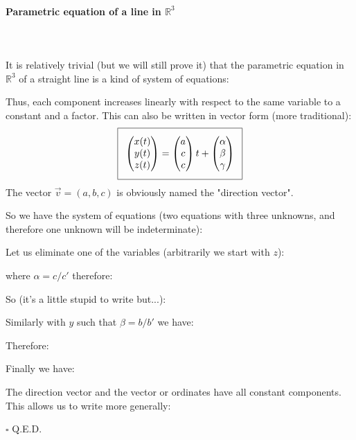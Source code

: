 	\paragraph{Parametric equation of a line in $\mathbb{R}^3$}\mbox{}\\\\
	It is relatively trivial (but we will still prove it) that the parametric equation in $\mathbb{R}^3$ of a straight line is a kind of system of equations:
	
	Thus, each component increases linearly with respect to the same variable to a constant and a factor. This can also be written in vector form (more traditional):
	\begin{equation}
  \addtolength{\fboxsep}{5pt}
   \boxed{
   \begin{gathered}
   		\begin{pmatrix}
   		x(t)\\y(t)\\z(t)
   		\end{pmatrix}=
   		\begin{pmatrix}
   		a\\c\\c
   		\end{pmatrix}t+\begin{pmatrix}
   		\alpha\\ \beta \\ \gamma
   		\end{pmatrix}
   \end{gathered}
   }
	\end{equation}
	The vector $\vec{v}=(a,b,c)$ is obviously named the "direction vector".
	\begin{dem}
	So we have the system of equations (two equations with three unknowns, and therefore one unknown will be indeterminate):
	
	Let us eliminate one of the variables (arbitrarily we start with $z$):
	
	where $\alpha=c/c'$ therefore:
	
	So (it's a little stupid to write but...):
	
	Similarly with $y$ such that $\beta=b/b'$ we have:
	
	Therefore:
	
	Finally we have:
	
	The direction vector and the vector or ordinates have all constant components. This allows us to write more generally:
	
	\begin{flushright}
		$\square$  Q.E.D.
	\end{flushright}
	\end{dem}
